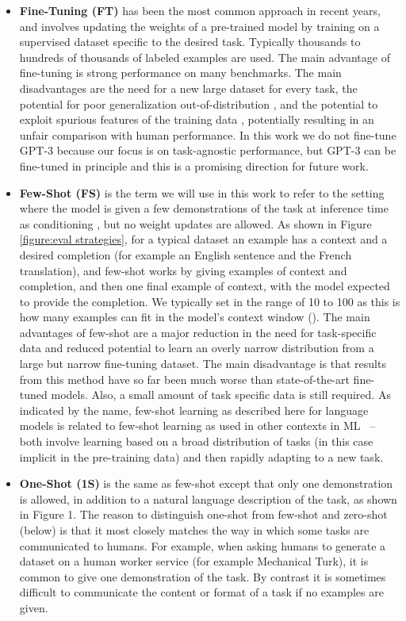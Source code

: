 \documentclass{article}
\begin{document}
\begin{itemize}
    \item \textbf{Fine-Tuning (FT)} has been the most common approach in recent years, and involves updating the weights of a pre-trained model by training on a supervised dataset specific to the desired task.  Typically thousands to hundreds of thousands of labeled examples are used.  The main advantage of fine-tuning is strong performance on many benchmarks. The main disadvantages are the need for a new large dataset for every task, the potential for poor generalization out-of-distribution \cite{mccoy2019right}, and the potential to exploit spurious features of the training data \cite{ gururangan2018annotation, niven2019probing}, potentially resulting in an unfair comparison with human performance. In this work we do not fine-tune GPT-3 because our focus is on task-agnostic performance, but GPT-3 can be fine-tuned in principle and this is a promising direction for future work.
    \item \textbf{Few-Shot (FS)} is the term we will use in this work to refer to the setting where the model is given a few demonstrations of the task at inference time as conditioning \cite{radford2019language}, but no weight updates are allowed.  As shown in Figure \ref{figure:eval strategies}, for a typical dataset an example has a context and a desired completion (for example an English sentence and the French translation), and few-shot works by giving  examples of context and completion, and then one final example of context, with the model expected to provide the completion.  We typically set  in the range of 10 to 100 as this is how many examples can fit in the model’s context window ().  The main advantages of few-shot are a major reduction in the need for task-specific data and reduced potential to learn an overly narrow distribution from a large but narrow fine-tuning dataset. The main disadvantage is that results from this method have so far been much worse than state-of-the-art fine-tuned models.  Also, a small amount of task specific data is still required. As indicated by the name, few-shot learning as described here for language models is related to few-shot learning as used in other contexts in ML~\citep{hochreiter2001learning, vinyals2016matching} -- both involve learning based on a broad distribution of tasks (in this case implicit in the pre-training data) and then rapidly adapting to a new task.
    \item \textbf{One-Shot (1S)} is the same as few-shot except that only one demonstration is allowed, in addition to a natural language description of the task, as shown in Figure 1. The reason to distinguish one-shot from few-shot and zero-shot (below) is that it most closely matches the way in which some tasks are communicated to humans.  For example, when asking humans to generate a dataset on a human worker service (for example Mechanical Turk), it is common to give one demonstration of the task.  By contrast it is sometimes difficult to communicate the content or format of a task if no examples are given.

\end{itemize}
\end{document}
